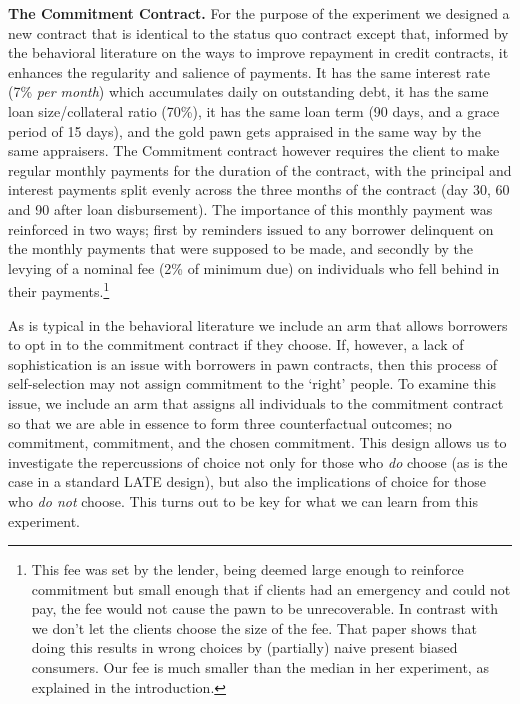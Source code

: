 \documentclass[oneside,11pt]{article}
\begin{document}
\noindent \textbf{The Commitment Contract.} For the purpose of the experiment we designed a new contract that is identical to the status quo contract except that, informed by the behavioral literature on the ways to improve repayment in credit contracts, it enhances the regularity and salience of payments. It has the same interest rate (7\% \textit{per month}) which accumulates daily on outstanding debt, it has the same loan size/collateral ratio (70\%), it has the same loan term (90 days, and a grace period of 15 days), and the gold pawn gets appraised in the same way by the same appraisers. The Commitment contract however requires the client to make regular monthly payments for the duration of the contract, with the principal and interest payments split evenly across the three months of the contract (day 30, 60 and 90 after loan disbursement). The importance of this monthly payment was reinforced in two ways; first by reminders issued to any borrower delinquent on the monthly payments that were supposed to be made, and secondly by the levying of a nominal fee (2\% of minimum due) on individuals who fell behind in their payments.\footnote{This fee was set by the lender, being deemed large enough to reinforce commitment but small enough that if clients had an emergency and could not pay, the fee would not cause the pawn to be unrecoverable.  In contrast with \cite{John} we don't let the clients choose the size of the fee. That paper shows that doing this results in wrong choices by (partially) naive present biased consumers. Our fee is much smaller than the median in her experiment, as explained in the introduction. %
}


As is typical in the behavioral literature we include an arm that allows borrowers to opt in to the commitment contract if they choose.  If, however, a lack of sophistication is an issue with borrowers in pawn contracts, then this process of self-selection may not assign commitment to the `right' people.  To examine this issue, we include an arm  that assigns all individuals to the commitment contract so that we are able in essence to form three counterfactual outcomes; no commitment, commitment, and the chosen commitment.  This design allows us to investigate the repercussions of choice not only for those who \textit{do} choose (as is the case in a standard LATE design), but also the implications of choice for those who \textit{do not} choose.  This turns out to be key for what we can learn from this experiment.  
\end{document}
